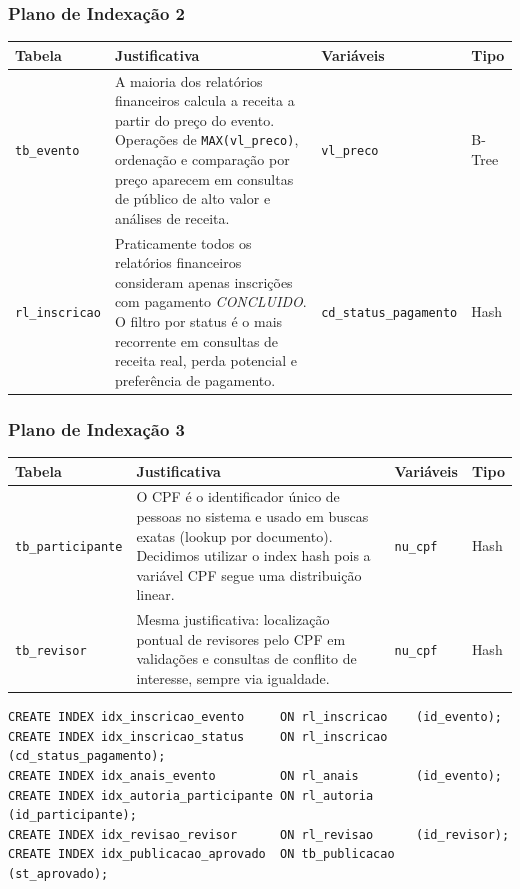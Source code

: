 \documentclass[12pt,a4paper]{article}
\begin{document}
\subsubsection*{Plano de Indexação 2}
\begin{tabularx}{\textwidth}{|l|X|l|l|}
\hline
\textbf{Tabela} & \textbf{Justificativa} & \textbf{Variáveis} & \textbf{Tipo} \\
\hline
\texttt{tb\_evento} & A maioria dos relatórios financeiros calcula a receita a partir do preço do evento. Operações de \texttt{MAX(vl\_preco)}, ordenação e comparação por preço aparecem em consultas de público de alto valor e análises de receita. & \texttt{vl\_preco} & B-Tree \\
\hline
\texttt{rl\_inscricao} & Praticamente todos os relatórios financeiros consideram apenas inscrições com pagamento \textit{CONCLUIDO}. O filtro por status é o mais recorrente em consultas de receita real, perda potencial e preferência de pagamento. & \texttt{cd\_status\_pagamento} & Hash \\
\hline
\end{tabularx}

\bigskip
\subsubsection*{Plano de Indexação 3}
\begin{tabularx}{\textwidth}{|l|X|l|l|}
\hline
\textbf{Tabela} & \textbf{Justificativa} & \textbf{Variáveis} & \textbf{Tipo} \\
\hline
\texttt{tb\_participante} & O CPF é o identificador único de pessoas no sistema e usado em buscas exatas (lookup por documento). Decidimos utilizar o index hash pois a variável CPF segue uma distribuição linear. & \texttt{nu\_cpf} & Hash \\
\hline
\texttt{tb\_revisor} & Mesma justificativa: localização pontual de revisores pelo CPF em validações e consultas de conflito de interesse, sempre via igualdade. & \texttt{nu\_cpf} & Hash \\
\hline
\end{tabularx}

\begin{lstlisting}[caption={DDL dos índices.},label={lst:ddl-indices}]
CREATE INDEX idx_inscricao_evento     ON rl_inscricao    (id_evento);
CREATE INDEX idx_inscricao_status     ON rl_inscricao    (cd_status_pagamento);
CREATE INDEX idx_anais_evento         ON rl_anais        (id_evento);
CREATE INDEX idx_autoria_participante ON rl_autoria      (id_participante);
CREATE INDEX idx_revisao_revisor      ON rl_revisao      (id_revisor);
CREATE INDEX idx_publicacao_aprovado  ON tb_publicacao   (st_aprovado);
\end{lstlisting}
\end{document}
